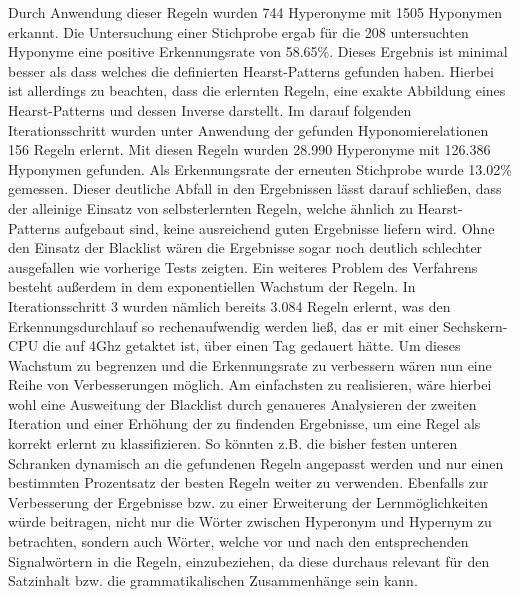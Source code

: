 Durch Anwendung dieser Regeln wurden 744 Hyperonyme mit 1505 
Hyponymen erkannt. Die Untersuchung einer Stichprobe ergab für die 
208 untersuchten Hyponyme eine positive Erkennungsrate von 58.65\%.
Dieses Ergebnis ist minimal besser als dass welches die definierten 
Hearst-Patterns gefunden haben. Hierbei ist allerdings zu beachten,
dass die erlernten Regeln, eine exakte Abbildung eines Hearst-Patterns
und dessen Inverse darstellt. %
Im darauf folgenden Iterationsschritt wurden unter Anwendung der gefunden
Hyponomierelationen 156 Regeln erlernt. Mit diesen Regeln wurden 
28.990 Hyperonyme mit 126.386 Hyponymen gefunden. Als Erkennungsrate
der erneuten Stichprobe wurde 13.02\% gemessen. Dieser deutliche 
Abfall in den Ergebnissen lässt darauf schließen, dass der alleinige
Einsatz von selbsterlernten Regeln, welche ähnlich zu Hearst-Patterns
aufgebaut sind, keine ausreichend guten Ergebnisse liefern wird. 
Ohne den Einsatz der Blacklist wären die Ergebnisse sogar noch deutlich
schlechter ausgefallen wie vorherige Tests zeigten. 
Ein weiteres Problem des Verfahrens besteht außerdem in dem exponentiellen
Wachstum der Regeln. In Iterationsschritt 3 wurden nämlich bereits 3.084
Regeln erlernt, was den Erkennungsdurchlauf so rechenaufwendig werden
ließ, das er mit einer Sechskern-CPU die auf 4Ghz getaktet ist, über 
einen Tag gedauert hätte. Um dieses Wachstum zu begrenzen und die 
Erkennungsrate zu verbessern wären nun eine Reihe von Verbesserungen
möglich. Am einfachsten zu realisieren, wäre hierbei wohl eine Ausweitung
der Blacklist durch genaueres Analysieren der zweiten Iteration und
einer Erhöhung der zu findenden Ergebnisse, um eine Regel als korrekt
erlernt zu klassifizieren. So könnten z.B. die bisher festen unteren 
Schranken dynamisch an die gefundenen Regeln angepasst werden und nur
einen bestimmten Prozentsatz der besten Regeln weiter zu verwenden.
Ebenfalls zur Verbesserung der Ergebnisse bzw. zu einer Erweiterung
der Lernmöglichkeiten würde beitragen, nicht nur die Wörter zwischen
Hyperonym und Hypernym zu betrachten, sondern auch Wörter, welche
vor und nach den entsprechenden Signalwörtern in die Regeln,
einzubeziehen, da diese durchaus relevant für den Satzinhalt bzw.
die grammatikalischen Zusammenhänge sein kann. 



